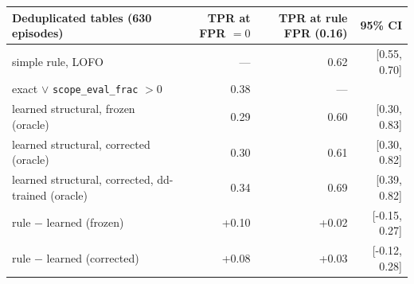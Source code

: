 \begin{tabular}{lrrr}\toprule
Deduplicated tables (630 episodes) & TPR at FPR $=0$ & TPR at rule FPR (0.16) & 95\% CI\\\midrule
simple rule, LOFO & --- & 0.62 & [0.55, 0.70]\\
exact $\lor$ \texttt{scope\_eval\_frac} $>0$ & 0.38 & --- & \\
learned structural, frozen (oracle) & 0.29 & 0.60 & [0.30, 0.83]\\
learned structural, corrected (oracle) & 0.30 & 0.61 & [0.30, 0.82]\\
learned structural, corrected, dd-trained (oracle) & 0.34 & 0.69 & [0.39, 0.82]\\
\midrule rule $-$ learned (frozen) & +0.10 & +0.02 & [-0.15, 0.27]\\
rule $-$ learned (corrected) & +0.08 & +0.03 & [-0.12, 0.28]\\
\bottomrule\end{tabular}
